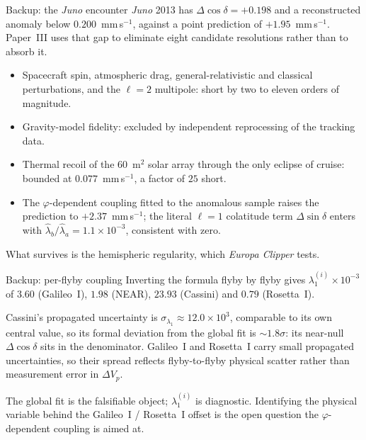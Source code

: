 \documentclass[aspectratio=169,10pt]{beamer}
\newcommand{\dVp}{\Delta V_p}
\newcommand{\Dcosd}{\Delta\!\cos\delta}
\begin{document}
\begin{frame}{Backup: the \textit{Juno} encounter}
  \footnotesize
  \textit{Juno} 2013 has $\Dcosd=+0.198$ and a reconstructed anomaly
  below $0.200$~mm\,s$^{-1}$, against a point prediction of
  $+1.95$~mm\,s$^{-1}$. Paper~III uses that gap to eliminate eight
  candidate resolutions rather than to absorb it.

  \vspace{0.4em}
  \begin{itemize}\setlength\itemsep{0.20em}
    \item Spacecraft spin, atmospheric drag, general-relativistic and
          classical perturbations, and the $\ell=2$ multipole: short by
          two to eleven orders of magnitude.
    \item Gravity-model fidelity: excluded by independent reprocessing
          of the tracking data.
    \item Thermal recoil of the $60$~m$^2$ solar array through the only
          eclipse of cruise: bounded at $0.077$~mm\,s$^{-1}$, a factor
          of $25$ short.
    \item The $\varphi$-dependent coupling fitted to the anomalous
          sample raises the prediction to $+2.37$~mm\,s$^{-1}$; the
          literal $\ell=1$ colatitude term $\Delta\!\sin\delta$ enters
          with $\hat\lambda_b/\hat\lambda_a=1.1\times10^{-3}$,
          consistent with zero.
  \end{itemize}

  \vspace{0.3em}
  What survives is the hemispheric regularity, which
  \textit{Europa Clipper} tests.
\end{frame}

\begin{frame}{Backup: per-flyby coupling}
  \footnotesize
  Inverting the formula flyby by flyby gives
  $\lambda_1^{(i)}\times10^{-3}$ of $3.60$ (Galileo~I), $1.98$ (NEAR),
  $23.93$ (Cassini) and $0.79$ (Rosetta~I).

  \vspace{0.4em}
  Cassini's propagated uncertainty is
  $\sigma_{\lambda_1}\approx12.0\times10^{3}$, comparable to its own
  central value, so its formal deviation from the global fit is
  $\sim1.8\sigma$: its near-null $\Dcosd$ sits in the denominator.
  Galileo~I and Rosetta~I carry small propagated uncertainties, so their
  spread reflects flyby-to-flyby physical scatter rather than
  measurement error in $\dVp$.

  \vspace{0.4em}
  The global fit is the falsifiable object; $\lambda_1^{(i)}$ is
  diagnostic. Identifying the physical variable behind the
  Galileo~I / Rosetta~I offset is the open question the
  $\varphi$-dependent coupling is aimed at.
\end{frame}
\fi
\end{document}
